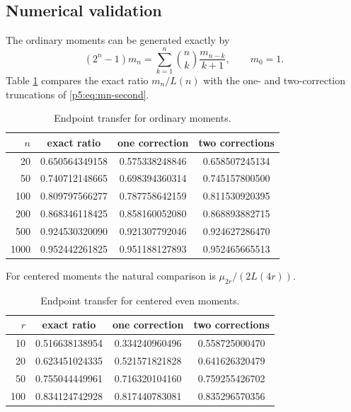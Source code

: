 \documentclass[11pt]{article}
\numberwithin{equation}{section}
\theoremstyle{definition}
\theoremstyle{remark}
\begin{document}
\subsection{Numerical validation}

The ordinary moments can be generated exactly by
\begin{equation}\label{p5:eq:mn-recurrence}
 (2^n-1)m_n=\sum_{k=1}^{n}\binom nk\frac{m_{n-k}}{k+1},
 \qquad m_0=1.
\end{equation}
Table \ref{p5:tab:ordinary-transfer} compares the exact ratio $m_n/L(n)$ with the
one- and two-correction truncations of \cref{p5:eq:mn-second}.

\begin{table}[ht]
\centering
\caption{Endpoint transfer for ordinary moments.}
\label{p5:tab:ordinary-transfer}
\begin{tabular}{@{}rccc@{}}
\toprule
$n$ & exact ratio & one correction & two corrections\\
\midrule
20   & 0.650564349158 & 0.575338248846 & 0.658507245134\\
50   & 0.740712148665 & 0.698394360314 & 0.745157800500\\
100  & 0.809797566277 & 0.787758642159 & 0.811530920395\\
200  & 0.868346118425 & 0.858160052080 & 0.868893882715\\
500  & 0.924530320090 & 0.921307792046 & 0.924627286470\\
1000 & 0.952442261825 & 0.951188127893 & 0.952465665513\\
\bottomrule
\end{tabular}
\end{table}

For centered moments the natural comparison is
$\mu_{2r}/(2L(4r))$.

\begin{table}[ht]
\centering
\caption{Endpoint transfer for centered even moments.}
\label{p5:tab:centered-transfer}
\begin{tabular}{@{}rccc@{}}
\toprule
$r$ & exact ratio & one correction & two corrections\\
\midrule
10  & 0.516638138954 & 0.334240960496 & 0.558725000470\\
20  & 0.623451024335 & 0.521571821828 & 0.641626320479\\
50  & 0.755044449961 & 0.716320104160 & 0.759255426702\\
100 & 0.834124742928 & 0.817440783081 & 0.835296570356\\
\bottomrule
\end{tabular}
\end{table}
\end{document}
